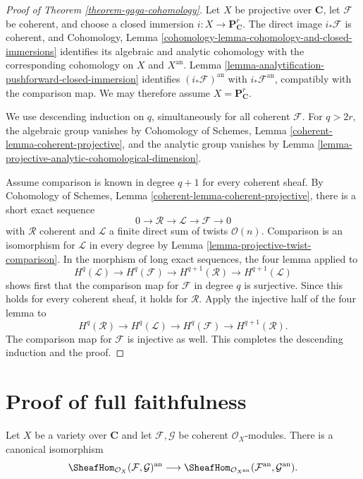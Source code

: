 \begin{proof}[Proof of Theorem \ref{theorem-gaga-cohomology}]
Let $X$ be projective over $\mathbf C$, let $\mathcal F$ be coherent, and
choose a closed immersion $i:X\to\mathbf P^r_{\mathbf C}$. The direct image
$i_*\mathcal F$ is coherent, and Cohomology, Lemma
\ref{cohomology-lemma-cohomology-and-closed-immersions} identifies its
algebraic and analytic cohomology with the corresponding cohomology on $X$
and $X^{\mathrm{an}}$. Lemma
\ref{lemma-analytification-pushforward-closed-immersion} identifies
$(i_*\mathcal F)^{\mathrm{an}}$ with $i_*\mathcal F^{\mathrm{an}}$, compatibly
with the comparison map. We may therefore assume
$X=\mathbf P^r_{\mathbf C}$.

We use descending induction on $q$, simultaneously for all coherent
$\mathcal F$. For $q>2r$, the algebraic group vanishes by Cohomology of
Schemes, Lemma \ref{coherent-lemma-coherent-projective}, and the analytic
group vanishes by Lemma
\ref{lemma-projective-analytic-cohomological-dimension}.

Assume comparison is known in degree $q+1$ for every coherent sheaf. By
Cohomology of Schemes, Lemma
\ref{coherent-lemma-coherent-projective}, there is a short exact sequence
$$
0\longrightarrow\mathcal R\longrightarrow
\mathcal L\longrightarrow\mathcal F\longrightarrow0
$$
with $\mathcal R$ coherent and $\mathcal L$ a finite direct sum of twists
$\mathcal O(n)$. Comparison is an isomorphism for $\mathcal L$ in every
degree by Lemma \ref{lemma-projective-twist-comparison}. In the morphism of
long exact sequences, the four lemma applied to
$$
H^q(\mathcal L)\longrightarrow H^q(\mathcal F)
\longrightarrow H^{q+1}(\mathcal R)\longrightarrow H^{q+1}(\mathcal L)
$$
shows first that the comparison map for $\mathcal F$ in degree $q$ is
surjective. Since this holds for every coherent sheaf, it holds for
$\mathcal R$. Apply the injective half of the four lemma to
$$
H^q(\mathcal R)\longrightarrow H^q(\mathcal L)
\longrightarrow H^q(\mathcal F)\longrightarrow H^{q+1}(\mathcal R).
$$
The comparison map for $\mathcal F$ is injective as well. This completes
the descending induction and the proof.
\end{proof}

\section{Proof of full faithfulness}
\label{section-proof-gaga-fully-faithful}

\begin{lemma}
\label{lemma-analytification-internal-hom}
Let $X$ be a variety over $\mathbf C$ and let $\mathcal F,\mathcal G$ be
coherent $\mathcal O_X$-modules. There is a canonical isomorphism
$$
\SheafHom_{\mathcal O_X}(\mathcal F,\mathcal G)^{\mathrm{an}}
\longrightarrow
\SheafHom_{\mathcal O_{X^{\mathrm{an}}}}
(\mathcal F^{\mathrm{an}},\mathcal G^{\mathrm{an}}).
$$
\end{lemma}

